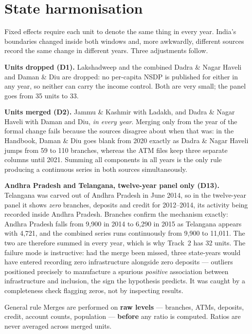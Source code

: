 \section{State harmonisation}
\label{sec:data-harmonisation}

Fixed effects require each unit to denote the same thing in every year. India's boundaries changed
inside both windows and, more awkwardly, different sources record the same change in different
years. Three adjustments follow.

\textbf{Units dropped (D1).} Lakshadweep and the combined Dadra \& Nagar Haveli and Daman \& Diu
are dropped: no per-capita NSDP is published for either in any year, so neither can carry the
income control. Both are very small; the panel goes from 35 units to 33.

\textbf{Units merged (D2).} Jammu \& Kashmir with Ladakh, and Dadra \& Nagar Haveli with Daman and
Diu, \emph{in every year}. Merging only from the year of the formal change fails because the
sources disagree about when that was: in the Handbook, Daman \& Diu goes blank from 2020 exactly as
Dadra \& Nagar Haveli jumps from 59 to 110 branches, whereas the ATM files keep three separate
columns until 2021. Summing all components in all years is the only rule producing a continuous
series in both sources simultaneously.

\textbf{Andhra Pradesh and Telangana, twelve-year panel only (D13).} Telangana was carved out of
Andhra Pradesh in June 2014, so in the twelve-year panel it shows \emph{zero} branches, deposits and
credit for 2012--2014, its activity being recorded inside Andhra Pradesh. Branches confirm the
mechanism exactly: Andhra Pradesh falls from 9,900 in 2014 to 6,290 in 2015 as Telangana appears
with 4,721, and the combined series runs continuously from 9,900 to 11,011. The two are therefore
summed in every year, which is why Track~2 has 32 units. The failure mode is instructive: had the
merge been missed, three state-years would have entered recording zero infrastructure alongside
zero deposits --- outliers positioned precisely to manufacture a spurious \emph{positive}
association between infrastructure and inclusion, the sign the hypothesis predicts. It was caught
by a completeness check flagging zeros, not by inspecting results.

\begin{keybox}{General rule}
Merges are performed on \textbf{raw levels} --- branches, ATMs, deposits, credit, account counts,
population --- \textbf{before} any ratio is computed. Ratios are never averaged across merged units.
\end{keybox}

